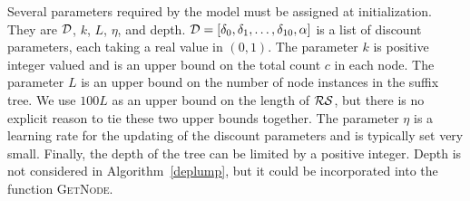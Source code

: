 

Several parameters required by the model must be assigned at initialization.  They are $\D$, $k$, $L$, $\eta$,  and depth.  $\D = [\dd_0, \dd_1, \ldots, \dd_{10}, \alpha]$ is a list of discount parameters, each taking a real value in $(0,1)$.  The parameter $k$ is positive integer valued and is an upper bound on the total count $c$ in each node.  The parameter $L$ is an upper bound on the number of node instances in the suffix tree.  We use $100L$ as an upper bound on the length of $\RS$, but there is no explicit reason to tie these two upper bounds together. The parameter $\eta$ is a learning rate for the updating of the discount parameters and is typically set very small.  Finally, the depth of the tree can be limited by a positive integer.  Depth is not considered in Algorithm~\ref{deplump}, but it could be incorporated into the function \textsc{GetNode}.


